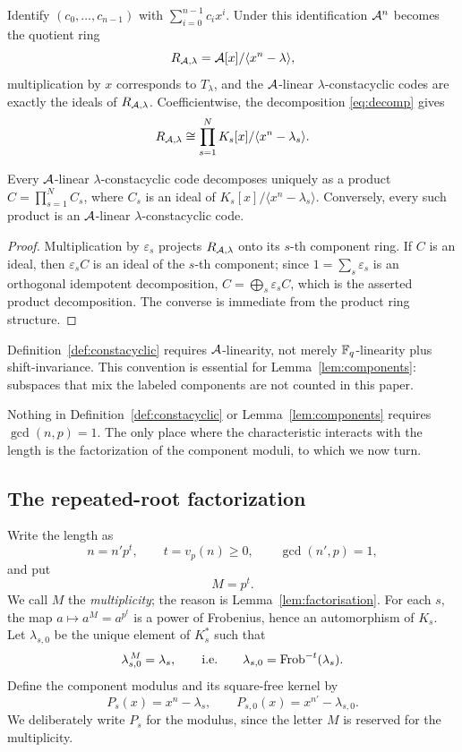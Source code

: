 Identify $(c_0,\ldots,c_{n-1})$ with $\sum_{i=0}^{n-1}c_ix^i$.  Under this
identification $\mathcal A^n$ becomes the quotient ring
\[
R_{\mathcal A,\lambda}=\mathcal A[x]/\langle x^n-\lambda\rangle,
\]
multiplication by $x$ corresponds to $T_\lambda$, and the $\mathcal A$-linear
$\lambda$-constacyclic codes are exactly the ideals of $R_{\mathcal A,\lambda}$.
Coefficientwise, the decomposition \eqref{eq:decomp} gives
\[
R_{\mathcal A,\lambda}\cong\prod_{s=1}^{N}K_s[x]/\langle x^n-\lambda_s\rangle .
\]

\begin{lemma}\label{lem:components}
Every $\mathcal A$-linear $\lambda$-constacyclic code decomposes uniquely as a product
$C=\prod_{s=1}^{N}C_s$, where $C_s$ is an ideal of
$K_s[x]/\langle x^n-\lambda_s\rangle$.  Conversely, every such product is an
$\mathcal A$-linear $\lambda$-constacyclic code.
\end{lemma}

\begin{proof}
Multiplication by $\varepsilon_s$ projects $R_{\mathcal A,\lambda}$ onto its $s$-th
component ring.  If $C$ is an ideal, then $\varepsilon_s C$ is an ideal of the
$s$-th component; since $1=\sum_s\varepsilon_s$ is an orthogonal idempotent
decomposition, $C=\bigoplus_s\varepsilon_s C$, which is the asserted product
decomposition.  The converse is immediate from the product ring structure.
\end{proof}

\begin{remark}\label{rem:Alinear}
Definition~\ref{def:constacyclic} requires $\mathcal A$-linearity, not merely
$\mathbb F_q$-linearity plus shift-invariance.  This convention is essential for
Lemma~\ref{lem:components}: subspaces that mix the labeled components are
not counted in this paper.
\end{remark}

Nothing in Definition~\ref{def:constacyclic} or Lemma~\ref{lem:components}
requires $\gcd(n,p)=1$.  The only place where the characteristic interacts with
the length is the factorization of the component moduli, to which we now turn.

\subsection{The repeated-root factorization}\label{sec:factorisation}

Write the length as
\[
n=n'p^t,\qquad t=v_p(n)\geq0,\qquad \gcd(n',p)=1,
\]
and put
\[
M=p^t .
\]
We call $M$ the \emph{multiplicity}; the reason is Lemma~\ref{lem:factorisation}.
For each $s$, the map $a\mapsto a^M=a^{p^t}$ is a power of Frobenius, hence an
automorphism of $K_s$.  Let $\lambda_{s,0}$ be the unique element of $K_s^\ast$
such that
\begin{equation}\label{eq:lambda0}
\lambda_{s,0}^{\,M}=\lambda_s,
\qquad\text{i.e.}\qquad
\lambda_{s,0}=\operatorname{Frob}^{-t}(\lambda_s).
\end{equation}
Define the component modulus and its square-free kernel by
\[
P_s(x)=x^n-\lambda_s,\qquad P_{s,0}(x)=x^{n'}-\lambda_{s,0}.
\]
We deliberately write $P_s$ for the modulus, since the letter $M$ is reserved
for the multiplicity.

